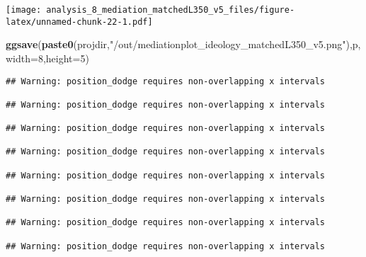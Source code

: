 \documentclass[
]{article}
\newenvironment{Shaded}{\begin{snugshade}}{\end{snugshade}}
\newcommand{\DataTypeTok}[1]{\textcolor[rgb]{0.13,0.29,0.53}{#1}}
\newcommand{\DecValTok}[1]{\textcolor[rgb]{0.00,0.00,0.81}{#1}}
\newcommand{\KeywordTok}[1]{\textcolor[rgb]{0.13,0.29,0.53}{\textbf{#1}}}
\newcommand{\NormalTok}[1]{#1}
\newcommand{\StringTok}[1]{\textcolor[rgb]{0.31,0.60,0.02}{#1}}
\begin{document}
\texttt{[image: analysis\_8\_mediation\_matchedL350\_v5\_files/figure-latex/unnamed-chunk-22-1.pdf]}

\begin{Shaded}
\begin{Highlighting}[]
\KeywordTok{ggsave}\NormalTok{(}\KeywordTok{paste0}\NormalTok{(projdir,}\StringTok{"/out/mediationplot_ideology_matchedL350_v5.png"}\NormalTok{),p,}\DataTypeTok{width=}\DecValTok{8}\NormalTok{,}\DataTypeTok{height=}\DecValTok{5}\NormalTok{)}
\end{Highlighting}
\end{Shaded}

\begin{verbatim}
## Warning: position_dodge requires non-overlapping x intervals

## Warning: position_dodge requires non-overlapping x intervals

## Warning: position_dodge requires non-overlapping x intervals

## Warning: position_dodge requires non-overlapping x intervals

## Warning: position_dodge requires non-overlapping x intervals

## Warning: position_dodge requires non-overlapping x intervals

## Warning: position_dodge requires non-overlapping x intervals

## Warning: position_dodge requires non-overlapping x intervals
\end{verbatim}
\end{document}

